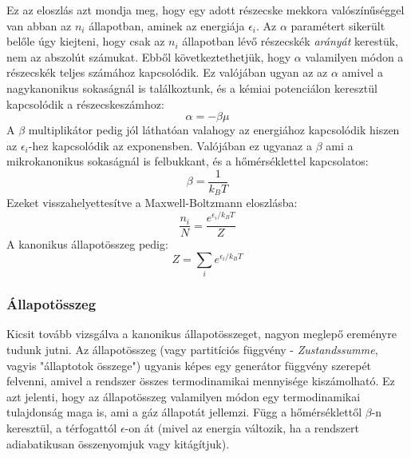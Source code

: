 \documentclass[../main.tex]{subfiles}
\begin{document}
Ez az eloszlás azt mondja meg, hogy egy adott részecske mekkora valószínűséggel van abban az $n_i$ állapotban, aminek az energiája $\epsilon_i$. Az $\alpha$ paramétert sikerült belőle úgy kiejteni,
hogy csak az $n_i$ állapotban lévő részecskék \textit{arányát} kerestük, nem az abszolút számukat. Ebből következtethetjük, hogy $\alpha$ valamilyen módon a részecskék teljes számához kapcsolódik. Ez valójában ugyan 
az az $\alpha$ amivel a nagykanonikus sokaságnál is találkoztunk, és a kémiai potenciálon keresztül kapcsolódik a részecskeszámhoz:
\begin{equation}
    \alpha = - \beta \mu
\end{equation}
A $\beta$ multiplikátor pedig jól láthatóan valahogy az energiához kapcsolódik hiszen az $\epsilon_i$-hez kapcsolódik az exponensben. Valójában ez ugyanaz a $\beta$ ami a mikrokanonikus sokaságnál is felbukkant, és a hőmérséklettel kapcsolatos:
\begin{equation}
    \beta = \frac{1}{k_B T}
\end{equation}
Ezeket visszahelyettesítve a Maxwell-Boltzmann eloszlásba:
\begin{equation}
    \frac{n_i}{N} = \frac{e^{ \epsilon_i/ k_B T}}{Z}
\end{equation}
A kanonikus állapotösszeg pedig:
\begin{equation}
    Z = \sum_i e^{\epsilon_i/ k_B T}
\end{equation}

\subsubsection{Állapotösszeg}
Kicsit tovább vizsgálva a kanonikus állapotösszeget, nagyon meglepő ereményre tudunk jutni. Az állapotösszeg (vagy partitíciós függvény - \textit{Zustandssumme}, vagyis "állaptotok összege") 
ugyanis képes egy generátor függvény szerepét felvenni, amivel a rendszer összes termodinamikai mennyisége kiszámolható. Ez azt jelenti, hogy az állapotösszeg valamilyen módon egy termodinamikai tulajdonság
maga is, ami a gáz állapotát jellemzi. Függ a hőmérséklettől $\beta$-n keresztül, a térfogattól $\epsilon$-on át (mivel az energia változik, ha a rendszert adiabatikusan összenyomjuk vagy kitágítjuk).
\end{document}
